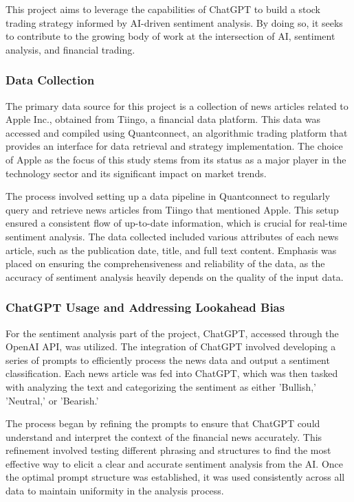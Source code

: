 This project aims to leverage the capabilities of ChatGPT to build a stock trading strategy informed by AI-driven sentiment analysis. By doing so, it seeks to contribute to the growing body of work at the intersection of AI, sentiment analysis, and financial trading.

\subsubsection{Data Collection}

The primary data source for this project is a collection of news articles related to Apple Inc., obtained from Tiingo, a financial data platform. This data was accessed and compiled using Quantconnect, an algorithmic trading platform that provides an interface for data retrieval and strategy implementation. The choice of Apple as the focus of this study stems from its status as a major player in the technology sector and its significant impact on market trends.

The process involved setting up a data pipeline in Quantconnect to regularly query and retrieve news articles from Tiingo that mentioned Apple. This setup ensured a consistent flow of up-to-date information, which is crucial for real-time sentiment analysis. The data collected included various attributes of each news article, such as the publication date, title, and full text content. Emphasis was placed on ensuring the comprehensiveness and reliability of the data, as the accuracy of sentiment analysis heavily depends on the quality of the input data.



\subsubsection{ChatGPT Usage and Addressing Lookahead Bias}
For the sentiment analysis part of the project, ChatGPT, accessed through the OpenAI API, was utilized. The integration of ChatGPT involved developing a series of prompts to efficiently process the news data and output a sentiment classification. Each news article was fed into ChatGPT, which was then tasked with analyzing the text and categorizing the sentiment as either 'Bullish,' 'Neutral,' or 'Bearish.'

The process began by refining the prompts to ensure that ChatGPT could understand and interpret the context of the financial news accurately. This refinement involved testing different phrasing and structures to find the most effective way to elicit a clear and accurate sentiment analysis from the AI. Once the optimal prompt structure was established, it was used consistently across all data to maintain uniformity in the analysis process.

